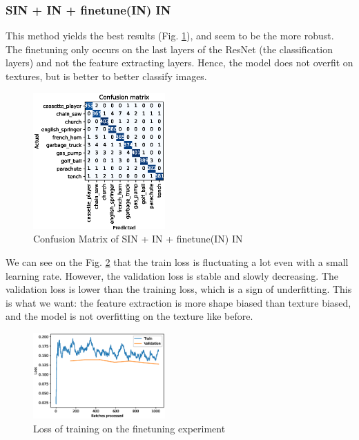 \documentclass{article}
\begin{document}
\subsubsection{SIN + IN + finetune(IN) \texorpdfstring{\textrightarrow} .IN}

This method yields the best results (Fig. \ref{cm_sinin-in-finetune}), and seem to be the more robust. The finetuning only occurs
on the last layers of the ResNet (the classification layers) and not the feature extracting layers.
Hence, the model does not overfit on textures, but is better to better classify images.

\begin{figure}[h!]
  \includegraphics[width = 0.45\textwidth]{imgs/sinin/finetune/fine_tune_confusion_matrix_0.974.eps}
  \caption{Confusion Matrix of SIN + IN + finetune(IN) \texorpdfstring{\textrightarrow} .IN}
  \label{cm_sinin-in-finetune}
\end{figure}



We can see on the Fig. \ref{loss_finetune} that the train loss is fluctuating a lot even with a small
learning rate. However, the validation loss is stable and slowly decreasing.
The validation loss is lower than the training loss, which is a sign of underfitting. This is what we want:
the feature extraction is more shape biased than texture biased, and the model is not overfitting on the texture like
before.

\begin{figure}[h!]
  \includegraphics[width = 0.45\textwidth]{imgs/sinin/finetune/loss.eps}
  \caption{Loss of training on the finetuning experiment}
  \label{loss_finetune}
\end{figure}
\end{document}
